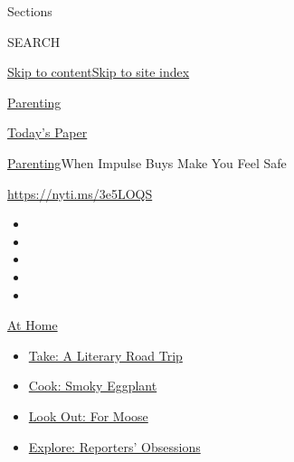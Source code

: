 Sections

SEARCH

\protect\hyperlink{site-content}{Skip to
content}\protect\hyperlink{site-index}{Skip to site index}

\href{https://www.nytimes3xbfgragh.onion/section/parenting}{Parenting}

\href{https://myaccount.nytimes3xbfgragh.onion/auth/login?response_type=cookie\&client_id=vi}{}

\href{https://www.nytimes3xbfgragh.onion/section/todayspaper}{Today's
Paper}

\href{/section/parenting}{Parenting}\textbar{}When Impulse Buys Make You
Feel Safe

\url{https://nyti.ms/3e5LOQS}

\begin{itemize}
\item
\item
\item
\item
\item
\end{itemize}

\href{https://www.nytimes3xbfgragh.onion/spotlight/at-home?action=click\&pgtype=Article\&state=default\&region=TOP_BANNER\&context=at_home_menu}{At
Home}

\begin{itemize}
\tightlist
\item
  \href{https://www.nytimes3xbfgragh.onion/2020/07/28/books/time-for-a-literary-road-trip.html?action=click\&pgtype=Article\&state=default\&region=TOP_BANNER\&context=at_home_menu}{Take:
  A Literary Road Trip}
\item
  \href{https://www.nytimes3xbfgragh.onion/2020/07/29/magazine/bored-with-your-home-cooking-some-smoky-eggplant-will-fix-that.html?action=click\&pgtype=Article\&state=default\&region=TOP_BANNER\&context=at_home_menu}{Cook:
  Smoky Eggplant}
\item
  \href{https://www.nytimes3xbfgragh.onion/2020/07/27/travel/moose-michigan-isle-royale.html?action=click\&pgtype=Article\&state=default\&region=TOP_BANNER\&context=at_home_menu}{Look
  Out: For Moose}
\item
  \href{https://www.nytimes3xbfgragh.onion/interactive/2020/at-home/even-more-reporters-editors-diaries-lists-recommendations.html?action=click\&pgtype=Article\&state=default\&region=TOP_BANNER\&context=at_home_menu}{Explore:
  Reporters' Obsessions}
\end{itemize}

